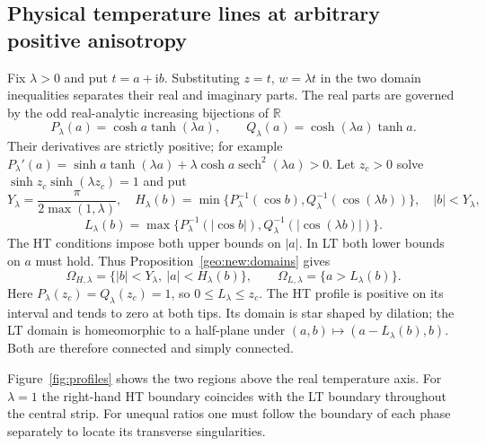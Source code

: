\documentclass[11pt]{article}
\numberwithin{equation}{section}
\theoremstyle{definition}
\newcommand{\ii}{\mathrm i}
\begin{document}
\subsection{Physical temperature lines at arbitrary positive anisotropy}

Fix $\lambda>0$ and put $t=a+\ii b$. Substituting $z=t$, $w=\lambda t$
in the two domain inequalities separates their real and imaginary
parts. The real parts are governed by the odd real-analytic increasing
bijections of $\mathbb R$
\[
 P_\lambda(a)=\cosh a\tanh(\lambda a),\qquad
 Q_\lambda(a)=\cosh(\lambda a)\tanh a.
\]
Their derivatives are strictly positive; for example
$P_\lambda'(a)=\sinh a\tanh(\lambda a)+
\lambda\cosh a\operatorname{sech}^2(\lambda a)>0$.
Let $z_c>0$ solve $\sinh z_c\sinh(\lambda z_c)=1$ and put
\[
 Y_\lambda=\frac\pi{2\max(1,\lambda)},\quad
 H_\lambda(b)=\min\{P_\lambda^{-1}(\cos b),
                         Q_\lambda^{-1}(\cos(\lambda b))\},
 \quad |b|<Y_\lambda,
\]
\[
 L_\lambda(b)=\max\{P_\lambda^{-1}(|\cos b|),
                         Q_\lambda^{-1}(|\cos(\lambda b)|)\}.
\]
The HT conditions impose both upper bounds on $|a|$. In LT both lower
bounds on $a$ must hold. Thus Proposition~\ref{geo:new:domains} gives
\begin{equation}\label{geo:new:pullbacks}
 \Omega_{H,\lambda}=\{|b|<Y_\lambda,\ |a|<H_\lambda(b)\},
 \qquad
 \Omega_{L,\lambda}=\{a>L_\lambda(b)\}.
\end{equation}
Here $P_\lambda(z_c)=Q_\lambda(z_c)=1$, so
$0\leq L_\lambda\leq z_c$.  The HT profile is positive
on its interval and tends to zero at both tips.  Its domain is
star shaped by dilation; the LT domain is homeomorphic to a
half-plane under $(a,b)\mapsto(a-L_\lambda(b),b)$.
Both are therefore connected and simply connected.

Figure~\ref{fig:profiles} shows the two regions above the real
temperature axis. For $\lambda=1$ the right-hand HT boundary coincides
with the LT boundary throughout the central strip. For unequal ratios one must follow the boundary of
each phase separately to locate its transverse singularities.
\end{document}
